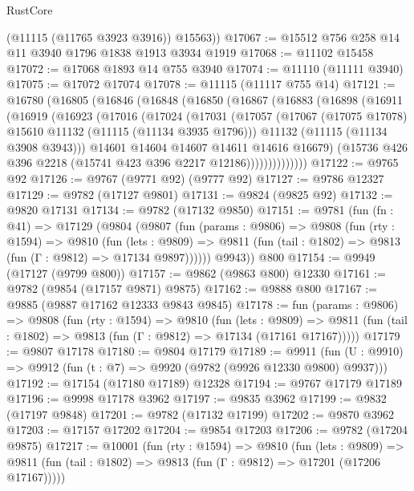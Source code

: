 \begin{lexlean}{RustCore}
\begin{coremodule}
        (@11115 (@11765 @3923 @3916))
        @15563))
@17067 := @15512 @756 @258 @14 @11 @3940 @1796 @1838 @1913 @3934 @1919
@17068 := @11102 @15458
@17072 := @17068 @1893 @14 @755 @3940
@17074 := @11110 (@11111 @3940)
@17075 := @17072 @17074
@17078 := @11115 (@11117 @755 @14)
@17121 := @16780
    (@16805
      (@16846
        (@16848
          (@16850
            (@16867
              (@16883
                (@16898
                  (@16911
                    (@16919
                      (@16923
                        (@17016
                          (@17024
                            (@17031
                              (@17057
                                (@17067 (@17075 @17078) @15610 @11132 (@11115 (@11134 @3935 @1796)))
                                @11132
                                (@11115 (@11134 @3908 @3943)))
                              @14601
                              @14604
                              @14607
                              @14611
                              @14616
                              @16679)
                            (@15736 @426 @396 @2218 (@15741 @423 @396 @2217 @12186))))))))))))))
@17122 := @9765 @92
@17126 := @9767 (@9771 @92) (@9777 @92)
@17127 := @9786 @12327
@17129 := @9782 (@17127 @9801)
@17131 := @9824 (@9825 @92)
@17132 := @9820 @17131
@17134 := @9782 (@17132 @9850)
@17151 := @9781
    (fun (fn : @41) =>
    @17129
      (@9804
        (@9807
          (fun (params : @9806) =>
          @9808
            (fun (rty : @1594) =>
            @9810
              (fun (lets : @9809) =>
              @9811 (fun (tail : @1802) => @9813 (fun (Γ : @9812) => @17134 @9897))))))
        @9943))
    @800
@17154 := @9949 (@17127 (@9799 @800))
@17157 := @9862 (@9863 @800) @12330
@17161 := @9782 (@9854 (@17157 @9871) @9875)
@17162 := @9888 @800
@17167 := @9885 (@9887 @17162 @12333 @9843 @9845)
@17178 := fun (params : @9806) =>
  @9808
    (fun (rty : @1594) =>
    @9810
      (fun (lets : @9809) =>
      @9811 (fun (tail : @1802) => @9813 (fun (Γ : @9812) => @17134 (@17161 @17167)))))
@17179 := @9807 @17178
@17180 := @9804 @17179
@17189 := @9911
    (fun (U : @9910) => @9912 (fun (t : @7) => @9920 (@9782 (@9926 @12330 @9800) @9937)))
@17192 := @17154 (@17180 @17189) @12328
@17194 := @9767 @17179 @17189
@17196 := @9998 @17178 @3962
@17197 := @9835 @3962
@17199 := @9832 (@17197 @9848)
@17201 := @9782 (@17132 @17199)
@17202 := @9870 @3962
@17203 := @17157 @17202
@17204 := @9854 @17203
@17206 := @9782 (@17204 @9875)
@17217 := @10001
    (fun (rty : @1594) =>
    @9810
      (fun (lets : @9809) =>
      @9811 (fun (tail : @1802) => @9813 (fun (Γ : @9812) => @17201 (@17206 @17167)))))

\end{coremodule}
\end{lexlean}
